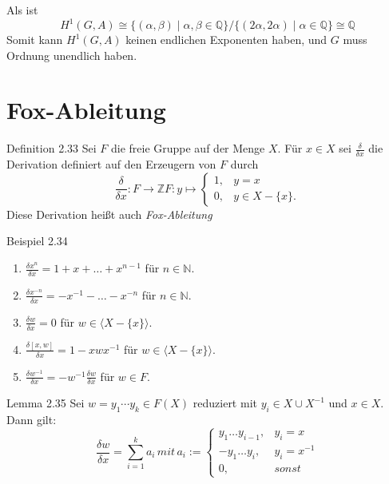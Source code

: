 \documentclass{beamer}
\begin{document}
\begin{frame}
Als ist 
\[
H^1(G,A)\cong \{(\alpha,\beta) \mid \alpha,\beta\in \mathbb{Q}\}/\{(2\alpha,2\alpha)\mid \alpha \in \mathbb{Q}\}\cong \mathbb{Q}
\]
Somit kann $H^1(G,A)$ keinen endlichen Exponenten haben, und $G$ muss Ordnung unendlich haben.
\end{frame}
\section{Fox-Ableitung}
\begin{frame}
\begin{block}{Definition 2.33}
Sei $F$ die freie Gruppe auf der Menge $X.$ Für $x\in X$ sei $\frac{\delta}{\delta x}$ die Derivation definiert auf den Erzeugern von $F$ durch
\[
\frac{\delta}{\delta x}:F\to \mathbb{Z}F:y\mapsto \begin{cases}
1,&y=x\\
0,&y\in X-\{x\}.
\end{cases}
\]
Diese Derivation heißt auch \emph{Fox-Ableitung}
\end{block}
\end{frame}
\begin{frame}
\begin{block}{Beispiel 2.34}
\begin{enumerate}
\item $\frac{\delta x^n}{\delta x}=1+x+\ldots+x^{n-1}$ für $n\in \mathbb{N}.$
\item $\frac{\delta x^{-n}}{\delta x}=-x^{-1}-\ldots-x^{-n}$ für $n\in \mathbb{N}.$
\item $\frac{\delta w}{\delta x}=0$ für $w\in \langle X-\{x\}\rangle.$
\item $\frac{\delta [x,w]}{\delta x}=1-xwx^{-1}$ für $w\in \langle X-\{x\}\rangle.$
\item $\frac{\delta w^{-1}}{\delta x}=-w^{-1}\frac{\delta w}{\delta x}$ für $w\in F.$
\end{enumerate}
\end{block}
\end{frame}
\begin{frame}
\begin{block}{Lemma 2.35}
Sei $w=y_1\cdots y_k\in F(X)$ reduziert mit $y_i\in X\cup X^{-1}$ und $x\in X.$ Dann gilt:
\[
\frac{\delta w}{\delta x}=\sum_{i=1}^ka_i\, mit \,a_i:=\begin{cases}
y_1\ldots y_{i-1},&y_i=x\\
-y_1\ldots y_{i},&y_i=x^{-1}\\
0,& sonst
\end{cases}
\]
\end{block}
\end{frame}
\end{document}
